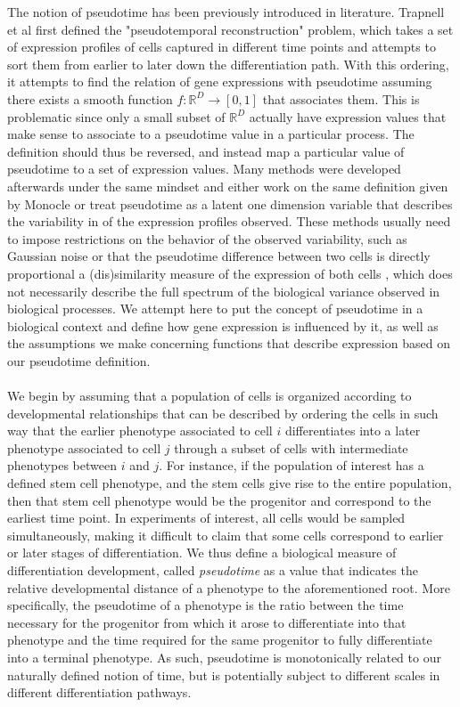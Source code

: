 \documentclass[11pt]{article}
\begin{document}
The notion of pseudotime has been previously introduced in literature. Trapnell et al \cite{trapnell2014dynamics} first defined the "pseudotemporal reconstruction" problem, which takes a set of expression profiles of cells captured in different time points and attempts to sort them from earlier to later down the differentiation path. With this ordering, it attempts to find the relation of gene expressions with pseudotime assuming there exists a smooth function $f: \mathbb{R}^D \to [0,1]$ that associates them. This is problematic since only a small subset of $\mathbb{R}^D$ actually have expression values that make sense to associate to a pseudotime value in a particular process. The definition should thus be reversed, and instead map a particular value of pseudotime to a set of expression values. Many methods were developed afterwards under the same mindset \cite{bendall2014single}\cite{ji2016tscan} \cite{haghverdi2016diffusion} \cite{aijo2014methods} \cite{campbell2015bayesian} and either work on the same definition given by Monocle or treat pseudotime as a latent one dimension variable that describes the variability in of the expression profiles observed. These methods usually need to impose restrictions on the behavior of the observed variability, such as Gaussian noise \cite{campbell2015bayesian} or that the pseudotime difference between two cells is directly proportional a (dis)similarity measure of the expression of both cells\cite{bendall2014single}\cite{ji2016tscan} \cite{haghverdi2016diffusion}, which does not necessarily describe the full spectrum of the biological variance observed in biological processes. We attempt here to put the concept of pseudotime in a biological context and define how gene expression is influenced by it, as well as the assumptions we make concerning functions that describe expression based on our pseudotime definition.\\
\\
We begin by assuming that a population of cells is organized according
to developmental relationships that can be described by ordering the cells in such way that the earlier phenotype associated to cell $i$ differentiates into a later phenotype associated to cell $j$ through a subset of cells with intermediate phenotypes between $i$ and $j$. For instance, if the population of interest has a defined stem cell phenotype, and the stem cells give rise to the entire population, then that stem cell phenotype would be the progenitor and correspond to the earliest time point. In experiments of interest, all cells would be sampled simultaneously, making it difficult to claim that some cells correspond to earlier or later stages of differentiation. We thus define a biological measure of differentiation development, called \emph{pseudotime} as a value that indicates the relative developmental distance of a phenotype to the aforementioned root. More specifically, the pseudotime of a phenotype is the ratio between the time necessary for the progenitor from which it arose to differentiate into that phenotype and the time required for the same progenitor to fully differentiate into a terminal phenotype. As such, pseudotime is monotonically related to our naturally defined notion of time, but is potentially subject to different scales in different differentiation pathways. \\
\end{document}
